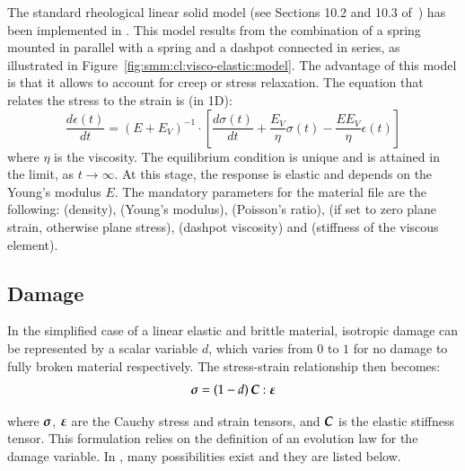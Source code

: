 The standard rheological linear solid model (see Sections 10.2 and 10.3
of~\cite{simo92}) has been implemented in \akantu. This model results from the
combination of a spring mounted in parallel with a spring and a dashpot
connected in series, as illustrated in
Figure~\ref{fig:smm:cl:visco-elastic:model}. The advantage of this model is that
it allows to account for creep or stress relaxation. The equation that relates
the stress to the strain is (in 1D):
\begin{equation}
  \frac{d\epsilon(t)}{dt} = \left ( E + E_V \right ) ^ {-1} \cdot \left [ \frac{d\sigma(t)}{dt} + \frac{E_V}{\eta}\sigma(t) - \frac{EE_V}{\eta}\epsilon(t) \right ]
\end{equation}
where $\eta$ is the viscosity. The equilibrium condition is unique and
is attained in the limit, as $t \to \infty $. At this stage, the
response is elastic and depends on the Young's modulus $E$.  The
mandatory parameters for the material file are the following:
 (density),  (Young's modulus),  (Poisson's
ratio),  (if set to zero plane strain, otherwise
plane stress),  (dashpot viscosity) and  (stiffness
of the viscous element).

\subsection{Damage}

In the  simplified case of a  linear elastic and brittle  material, isotropic
damage can be represented by a scalar variable $d$, which varies from $0$ to $1$
for  no  damage  to  fully  broken  material  respectively.  The  stress-strain
relationship then becomes:
\begin{equation*}
  \boldsymbol{\sigma} = (1-d)\, \boldsymbol{C}:\boldsymbol{\varepsilon}
\end{equation*}

where  $\boldsymbol{\sigma}$,  $\boldsymbol{\varepsilon}$ are  the  Cauchy  stress and  strain
tensors, and $\boldsymbol{C}$ is the elastic stiffness tensor. This formulation relies
on the definition of an evolution law for the damage variable. In \akantu, many
possibilities exist and they are listed below.

